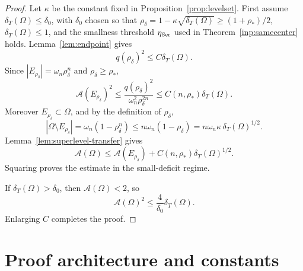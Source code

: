 \documentclass[11pt]{amsart}
\theoremstyle{definition}
\newcommand{\Om}{\Omega}
\newcommand{\Fr}{\mathcal A}
\newcommand{\dT}{\delta_T}
\newcommand{\rstar}{\rho_*}
\newcommand{\rdel}{\rho_\delta}
\begin{document}
\begin{proof}
Let \(\kappa\) be the constant fixed in Proposition~\ref{prop:levelset}.
First assume \(\dT(\Om)\le\delta_0\), with \(\delta_0\) chosen so that
\(\rdel=1-\kappa\sqrt{\dT(\Om)}\ge(1+\rstar)/2\), \(\dT(\Om)\le1\), and
the smallness threshold \(\eta_{\rm Ser}\) used in
Theorem~\ref{inp:samecenter} holds.
Lemma~\ref{lem:endpoint} gives
\[
   q(\rdel)^2\le C\dT(\Om).
\]
Since \(|E_{\rdel}|=\omega_n\rdel^n\) and \(\rdel\ge\rstar\),
\[
   \Fr(E_{\rdel})^2
   \le \frac{q(\rdel)^2}{\omega_n^2\rdel^{2n}}
   \le C(n,\rstar)\dT(\Om).
\]
Moreover \(E_{\rdel}\subset\Om\), and by the definition of \(\rdel\),
\[
   |\Om\setminus E_{\rdel}|
   =\omega_n(1-\rdel^n)
   \le n\omega_n(1-\rdel)
   =n\omega_n\kappa\,\dT(\Om)^{1/2}.
\]
Lemma~\ref{lem:superlevel-transfer} gives
\[
   \Fr(\Om)
   \le \Fr(E_{\rdel})+C(n,\rstar)\dT(\Om)^{1/2}.
\]
Squaring proves the estimate in the small-deficit regime.

If \(\dT(\Om)>\delta_0\), then \(\Fr(\Om)<2\), so
\[
   \Fr(\Om)^2\le \frac{4}{\delta_0}\dT(\Om).
\]
Enlarging \(C\) completes the proof.
\end{proof}





\section{Proof architecture and constants}\label{sec:architecture}
\end{document}
